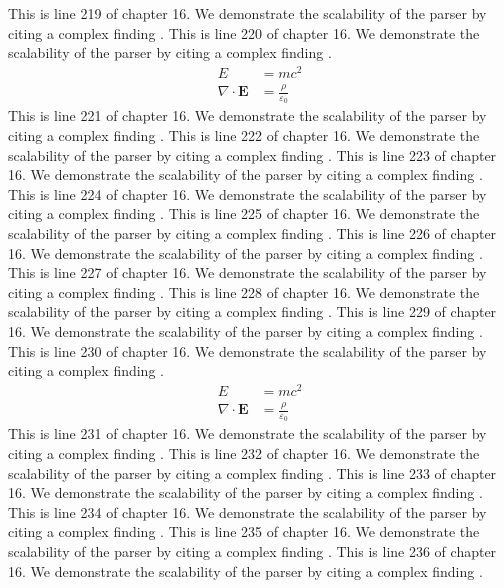 This is line 219 of chapter 16. We demonstrate the scalability of the parser by citing a complex finding \cite{ref16_219}.
This is line 220 of chapter 16. We demonstrate the scalability of the parser by citing a complex finding \cite{ref16_220}.
\begin{align*}
  E &= mc^2 \\
  \nabla \cdot \mathbf{E} &= \frac{\rho}{\varepsilon_0}
\end{align*}
This is line 221 of chapter 16. We demonstrate the scalability of the parser by citing a complex finding \cite{ref16_221}.
This is line 222 of chapter 16. We demonstrate the scalability of the parser by citing a complex finding \cite{ref16_222}.
This is line 223 of chapter 16. We demonstrate the scalability of the parser by citing a complex finding \cite{ref16_223}.
This is line 224 of chapter 16. We demonstrate the scalability of the parser by citing a complex finding \cite{ref16_224}.
This is line 225 of chapter 16. We demonstrate the scalability of the parser by citing a complex finding \cite{ref16_225}.
This is line 226 of chapter 16. We demonstrate the scalability of the parser by citing a complex finding \cite{ref16_226}.
This is line 227 of chapter 16. We demonstrate the scalability of the parser by citing a complex finding \cite{ref16_227}.
This is line 228 of chapter 16. We demonstrate the scalability of the parser by citing a complex finding \cite{ref16_228}.
This is line 229 of chapter 16. We demonstrate the scalability of the parser by citing a complex finding \cite{ref16_229}.
This is line 230 of chapter 16. We demonstrate the scalability of the parser by citing a complex finding \cite{ref16_230}.
\begin{align*}
  E &= mc^2 \\
  \nabla \cdot \mathbf{E} &= \frac{\rho}{\varepsilon_0}
\end{align*}
This is line 231 of chapter 16. We demonstrate the scalability of the parser by citing a complex finding \cite{ref16_231}.
This is line 232 of chapter 16. We demonstrate the scalability of the parser by citing a complex finding \cite{ref16_232}.
This is line 233 of chapter 16. We demonstrate the scalability of the parser by citing a complex finding \cite{ref16_233}.
This is line 234 of chapter 16. We demonstrate the scalability of the parser by citing a complex finding \cite{ref16_234}.
This is line 235 of chapter 16. We demonstrate the scalability of the parser by citing a complex finding \cite{ref16_235}.
This is line 236 of chapter 16. We demonstrate the scalability of the parser by citing a complex finding \cite{ref16_236}.
